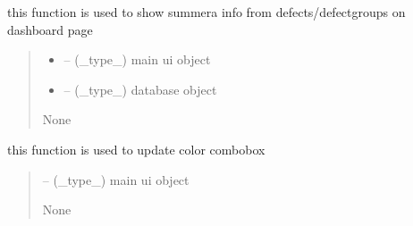 \documentclass[letterpaper,10pt,english]{sphinxmanual}
\begin{document}
\begin{savenotes}\begin{fulllineitems}
\label{\detokenize{setting/backend/defect_management_funcs:oxin.backend.defect_management_funcs.show_defects_summary_info}}
\pysigstartsignatures
{}
\pysigstopsignatures
\sphinxAtStartPar
this function is used to show summera info from defects/defect\sphinxhyphen{}groups on dashboard page
\begin{quote}\begin{description}
\begin{itemize}
\item {} 
\sphinxAtStartPar
{} – (\_type\_) main ui object

\item {} 
\sphinxAtStartPar
{} – (\_type\_) database object

\end{itemize}

\sphinxAtStartPar
None

\end{description}\end{quote}

\end{fulllineitems}\end{savenotes}


\begin{savenotes}\begin{fulllineitems}
\label{\detokenize{setting/backend/defect_management_funcs:oxin.backend.defect_management_funcs.update_combo_color}}
\pysigstartsignatures
{}
\pysigstopsignatures
\sphinxAtStartPar
this function is used to update color combobox
\begin{quote}\begin{description}
\sphinxAtStartPar
{} – (\_type\_) main ui object

\sphinxAtStartPar
None

\end{description}\end{quote}

\end{fulllineitems}\end{savenotes}
\end{document}
